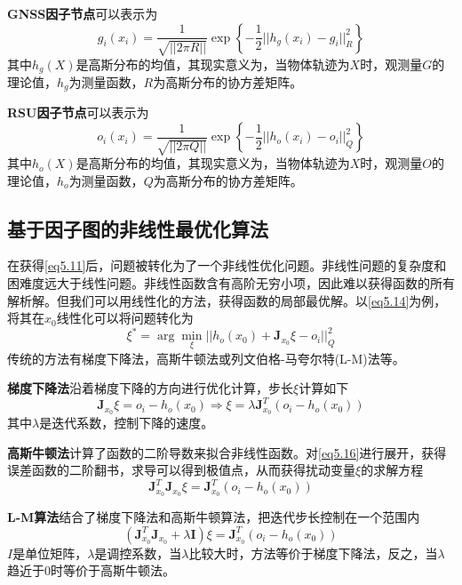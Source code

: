 \textbf{GNSS因子节点}可以表示为
\begin{equation}
    g_i(x_i)=\frac{1}{\sqrt{||2\pi R||}}\exp\left\{-\frac{1}{2}||h_g(x_i)-g_i||^2_R\right\}
\end{equation}
其中$h_g(X)$是高斯分布的均值，其现实意义为，当物体轨迹为$X$时，观测量$G$的理论值，$h_g$为测量函数，$R$为高斯分布的协方差矩阵。

\textbf{RSU因子节点}可以表示为
\begin{equation}
    o_i(x_i)=\frac{1}{\sqrt{||2\pi Q||}}\exp\left\{-\frac{1}{2}||h_o(x_i)-o_i||^2_Q\right\}
    \label{eq5.14}
\end{equation}
其中$h_o(X)$是高斯分布的均值，其现实意义为，当物体轨迹为$X$时，观测量$O$的理论值，$h_o$为测量函数，$Q$为高斯分布的协方差矩阵。

\subsection{基于因子图的非线性最优化算法}

在获得\eqref{eq5.11}后，问题被转化为了一个非线性优化问题。非线性问题的复杂度和困难度远大于线性问题。非线性函数含有高阶无穷小项，因此难以获得函数的所有解析解。但我们可以用线性化的方法，获得函数的局部最优解。以\eqref{eq5.14}为例，将其在$x_0$线性化可以将问题转化为
\begin{equation}
    \xi^*=\arg\min\limits_\xi||h_o(x_0)+\mathbf{J}_{x_0}\xi-o_i||^2_Q
    \label{eq5.16}
\end{equation}
传统的方法有梯度下降法，高斯牛顿法或列文伯格-马夸尔特(L-M)法等。

\textbf{梯度下降法}沿着梯度下降的方向进行优化计算，步长$\xi$计算如下
\begin{equation}
    \mathbf{J}_{x_0}\xi=o_i-h_o(x_0)\Rightarrow\xi=\lambda\mathbf{J}_{x_0}^T(o_i-h_o(x_0))
\end{equation}
其中$\lambda$是迭代系数，控制下降的速度。

\textbf{高斯牛顿法}计算了函数的二阶导数来拟合非线性函数。对\eqref{eq5.16}进行展开，获得误差函数的二阶翻书，求导可以得到极值点，从而获得扰动变量$\xi$的求解方程
\begin{equation}
    \mathbf{J}_{x_0}^T\mathbf{J}_{x_0}\xi=\mathbf{J}_{x_0}^T(o_i-h_o(x_0))
\end{equation}

\textbf{L-M算法}结合了梯度下降法和高斯牛顿算法，把迭代步长控制在一个范围内
\begin{equation}
    (\mathbf{J}_{x_0}^T\mathbf{J}_{x_0}+\lambda\mathbf{I})\xi=\mathbf{J}_{x_0}^T(o_i-h_o(x_0))
\end{equation}
$I$是单位矩阵，$\lambda$是调控系数，当$\lambda$比较大时，方法等价于梯度下降法，反之，当$\lambda$趋近于0时等价于高斯牛顿法。

